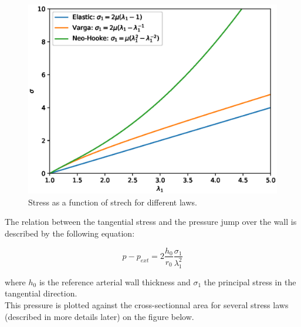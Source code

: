 \documentclass{config}
\begin{document}
\begin{figure}[H]
\begin{center}
\includegraphics[scale=0.6]{figures/sigma.eps}
\caption{Stress as a function of strech for different laws.}
\label{sigma_lambda}
\end{center}
\end{figure}

The relation between the tangential stress and the pressure jump over the wall is described by the following equation:

\begin{equation}\label{pressure_relation}
p - p_{ext}= 2 \frac{h_0}{r_0} \frac{\sigma_1}{\lambda_1 ^2}
\end{equation}

where $h_0$ is the reference arterial wall thickness and $\sigma_1$ the principal stress in the tangential direction. \\ 

This pressure is plotted against the cross-sectionnal area for several stress laws (described in more details later) on the figure below.
\end{document}
